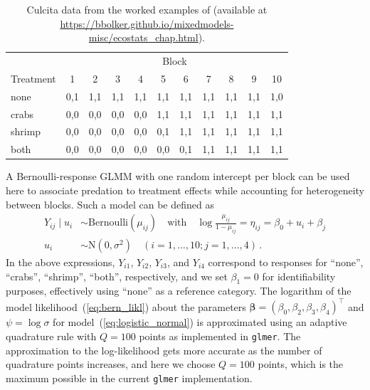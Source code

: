 \documentclass[11pt, a4paper]{article}
\newcommand*{\bb}{\boldsymbol}
\theoremstyle{example} \newtheorem{example}{Example}[section]
\theoremstyle{theorem} \newtheorem{theorem}{Theorem}[section]
\def\bbeta{\bb{\beta}}
\begin{document}
  \begin{table}[t]
    \caption{Culcita data \citep{mckeon2012multiple} from the worked
      examples of \citet{bolker:2015} (available at
      \url{https://bbolker.github.io/mixedmodels-misc/ecostats\_chap.html}).}
    \label{tab:culcita}
    \centering
    \begin{tabular}{lllllllllll}
      \toprule
      & \multicolumn{10}{c}{Block} \\ \cmidrule{2-11}
      \multicolumn{1}{c}{Treatment} & \multicolumn{1}{c}{1} & \multicolumn{1}{c}{2} & \multicolumn{1}{c}{3} & \multicolumn{1}{c}{4} & \multicolumn{1}{c}{5} & \multicolumn{1}{c}{6} & \multicolumn{1}{c}{7} & \multicolumn{1}{c}{8} & \multicolumn{1}{c}{9} & \multicolumn{1}{c}{10} \\
      \midrule
      none & 0,1 & 1,1 & 1,1 & 1,1 & 1,1 & 1,1 & 1,1 & 1,1 & 1,1 & 1,0 \\
      crabs & 0,0 & 0,0 & 0,0 & 0,0 & 1,1 & 1,1 & 1,1 & 1,1 & 1,1 & 1,1 \\
      shrimp & 0,0 & 0,0 & 0,0 & 0,0 & 0,1 & 1,1 & 1,1 & 1,1 & 1,1 & 1,1 \\
      both & 0,0 & 0,0 & 0,0 & 0,0 & 0,0 & 0,1 & 1,1 & 1,1 & 1,1 & 1,1 \\
      \bottomrule
    \end{tabular}
\end{table}

A Bernoulli-response GLMM with one random intercept per block can be
used here to associate predation to treatment effects while
accounting for heterogeneity between blocks. Such a model can be
defined as
\begin{align}
  \label{eq:logistic_normal}
  Y_{ij} \mid u_i & \sim \text{Bernoulli}(\mu_{ij}) \quad  \text{with} \quad
  \log{\frac{\mu_{ij}}{1 - \mu_{ij}}} =  \eta_{ij} =  \beta_0 + u_i + \beta_{j} \\ 
  u_i & \sim \text{N}(0, \sigma^2) \quad (i = 1, \ldots, 10; j = 1, \ldots, 4)\,.
\end{align}
In the above expressions, $Y_{i1}$, $Y_{i2}$, $Y_{i3}$, and $Y_{i4}$
correspond to responses for ``none'', ``crabs'', ``shrimp'', ``both'',
respectively, and we set $\beta_1 = 0$ for identifiability purposes,
effectively using ``none'' as a reference category. The logarithm of the model likelihood~(\ref{eq:bern_likl}) about the parameters
$\bbeta = (\beta_0, \beta_2, \beta_3, \beta_4)^\top$ and
$\psi = \log\sigma$ for model~(\ref{eq:logistic_normal}) is
approximated using an adaptive quadrature rule with $Q = 100$ points
\citep[see, for example,][]{liu+pierce:1994, pinheiro1995approximations} as
implemented in \texttt{glmer}.  The approximation to the log-likelihood
gets more accurate as the number of quadrature points increases, and
here we choose $Q = 100$ points, which is the maximum possible in the
current \texttt{glmer} implementation.
\end{document}
